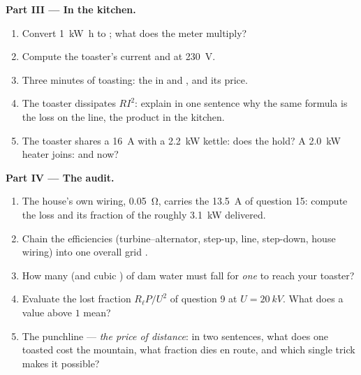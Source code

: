 \begin{problem}
\medskip
\noindent\textbf{Part III --- In the kitchen.}
\begin{enumerate}[resume]
  \item Convert \qty{1}{kW.h} to ; what does the meter multiply?
  \item Compute the toaster's current and  at \qty{230}{V}.
  \item Three minutes of toasting: the  in  and
        , and its price.
  \item The toaster dissipates $RI^2$: explain in one sentence why the
        same formula is the loss on the line, the product in the kitchen.
  \item The toaster shares a \qty{16}{A}  with a \qty{2.2}{kW}
        kettle: does the  hold? A \qty{2.0}{kW} heater joins: and now?
\end{enumerate}

\medskip
\noindent\textbf{Part IV --- The audit.}
\begin{enumerate}[resume]
  \item The house's own wiring,  \qty{0.05}{\ohm}, carries the
        \qty{13.5}{A} of question 15: compute the loss and its fraction
        of the roughly \qty{3.1}{kW} delivered.
  \item Chain the efficiencies (turbine--alternator, step-up, line,
        step-down, house wiring) into one overall grid .
  \item How many  (and cubic ) of dam water must fall for
        \emph{one}  to reach your toaster?
  \item Evaluate the lost fraction $R_\ell P/U^2$ of question 9 at
        $U = \qty{20}{kV}$. What does a value above $1$ mean?
  \item The punchline --- \emph{the price of distance}: in two sentences,
        what does one toasted  cost the mountain, what
        fraction dies en route, and which single trick makes it possible?
\end{enumerate}
\end{problem}
